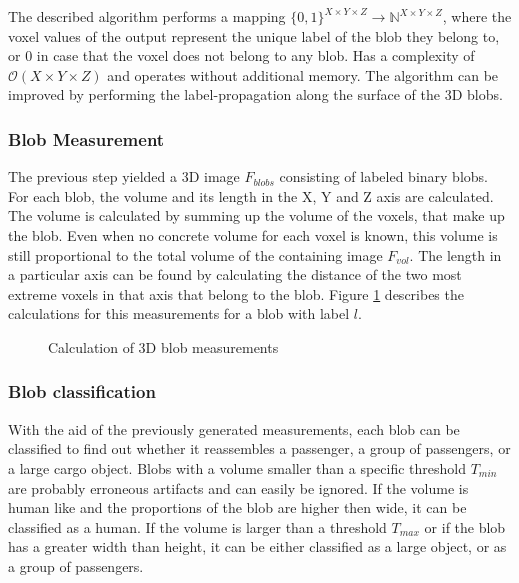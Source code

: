 The described algorithm performs a mapping $ \{0, 1\}^{X \times Y \times Z} \rightarrow \mathbb{N}^{X \times Y \times Z} $, where the voxel values of the output represent the unique label of the blob they belong to, or 0 in case that the voxel does not belong to any blob.
Has a complexity of $ \mathcal{O}(X \times Y \times Z) $ and operates without additional memory. 
The algorithm can be improved by performing the label-propagation along the surface of the \ac{3D} blobs.

\subsubsection{Blob Measurement}

The previous step yielded a \ac{3D} image $ F_{blobs} $ consisting of labeled binary blobs.
For each blob, the volume and its length in the X, Y and Z axis are calculated.
The volume is calculated by summing up the volume of the voxels, that make up the blob.
Even when no concrete volume for each voxel is known, this volume is still proportional to the total volume of the containing image $ F_{vol} $.
The length in a particular axis can be found  by calculating the distance of the two most extreme voxels in that axis that belong to the blob.
Figure \ref{fig:design:blobmeasurement} describes the calculations for this measurements for a blob with label $ l $.

\begin{figure}[h!]
\caption{Calculation of 3D blob measurements}
\label{fig:design:blobmeasurement}
\end{figure}

\subsubsection{Blob classification}
With the aid of the previously generated measurements, each blob can be classified to find out whether it reassembles a passenger, a group of passengers, or a large cargo object.
Blobs with a volume smaller than a specific threshold $ T_{min} $ are probably erroneous artifacts and can easily be ignored.
If the volume is human like and the proportions of the blob are higher then wide, it can be classified as a human. 
If the volume is larger than a threshold $ T_{max} $ or if the blob has a greater width than height, it can be either classified as a large object, or as a group of passengers.

